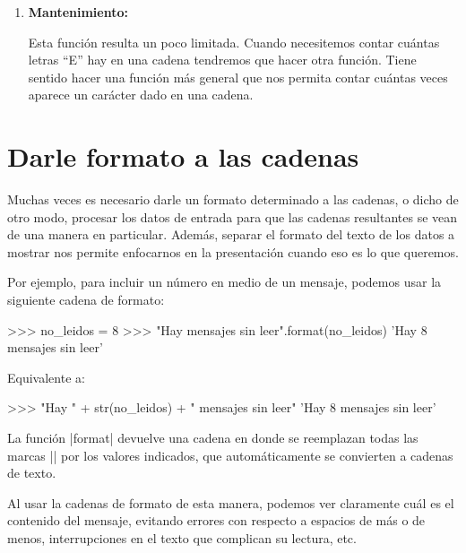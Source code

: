 \begin{enumerate}
\item {\bf Mantenimiento:}

Esta función resulta un poco limitada. Cuando necesitemos contar
cuántas letras ``E'' hay en una cadena tendremos que hacer otra función.
Tiene sentido hacer una función más general que nos permita contar cuántas
veces aparece un carácter dado en una cadena.




\end{enumerate}

\section{Darle formato a las cadenas}

Muchas veces es necesario darle un formato determinado a las cadenas, o dicho de
otro modo, procesar los datos de entrada para que las cadenas resultantes se
vean de una manera en particular. Además, separar el formato del texto de los
datos a mostrar nos permite enfocarnos en la presentación cuando eso es lo que
queremos.

Por ejemplo, para incluir un número en medio de un mensaje, podemos usar la
siguiente cadena de formato:

\begin{codigo-python-sn}
>>> no_leidos = 8
>>> "Hay {} mensajes sin leer".format(no_leidos)
'Hay 8 mensajes sin leer'
\end{codigo-python-sn}

Equivalente a:

\begin{codigo-python-sn}
>>> "Hay " + str(no_leidos) + " mensajes sin leer"
'Hay 8 mensajes sin leer'
\end{codigo-python-sn}

La función |format| devuelve una cadena en donde se reemplazan todas las marcas
|{}| por los valores indicados, que automáticamente se convierten a cadenas de
texto.

Al usar la cadenas de formato de
esta manera, podemos ver claramente cuál es el contenido del mensaje, evitando
errores con respecto a espacios de más o de menos, interrupciones en el texto
que complican su lectura, etc.

